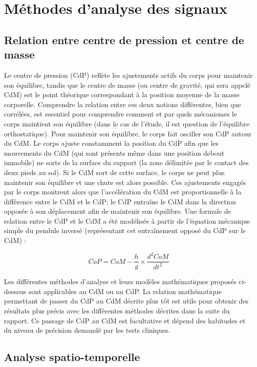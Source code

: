 \section{Méthodes d'analyse des signaux}

\subsection{Relation entre centre de pression et centre de masse}

Le centre de pression (CdP) reflète les ajustements actifs du corps pour maintenir son équilibre, tandis que le centre de masse (ou centre de gravité, qui sera appelé CdM) est le point théorique correspondant à la position moyenne de la masse corporelle.
Comprendre la relation entre ces deux notions différentes, bien que corrélées, est essentiel pour comprendre comment et par quels mécanismes le corps maintient son équilibre (dans le cas de l'étude, il est question de l'équilibre orthostatique).
Pour maintenir son équilibre, le corps fait osciller son CdP autour du CdM. 
Le corps ajuste constamment la position du CdP afin que les mouvements du CdM (qui sont présents même dans une position debout immobile) ne sorte de la surface du support (la zone délimitée par le contact des deux pieds au sol). 
Si le CdM sort de cette surface, le corps ne peut plus maintenir son équilibre et une chute est alors possible.
Ces ajustements engagés par le corps montrent alors que l'accélération du CdM est proportionnelle à la différence entre le CdM et le CdP; le CdP entraîne le CdM dans la direction opposée à son déplacement afin de maintenir son équilibre.
Une formule de relation entre le CdP et le CdM a été modélisée à partir de l'équation mécanique simple du pendule inversé (représentant cet entraînement opposé du CdP sur le CdM) : 

\[
    CoP = CoM - \frac{h}{g} \times \frac{d^2 CoM}{dt^2}
\]

Les différentes méthodes d'analyse et leurs modèles mathématiques proposés ci-dessous sont applicables au CdM ou au CdP.
La relation mathématique permettant de passer du CdP au CdM décrite plus tôt est utile pour obtenir des résultats plus précis avec les différentes méthodes décrites dans la suite du rapport.
Ce passage de CdP au CdM est facultative et dépend des habitudes et du niveau de précision demandé par les tests cliniques.

\subsection{Analyse spatio-temporelle}

